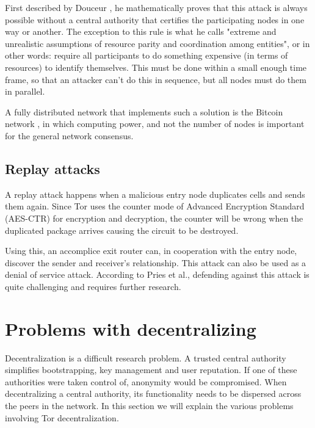 \documentclass{article}
\begin{document}
		First described by Douceur \cite{douceur2002sybil}, he mathematically proves that this attack is always possible without a central authority that certifies the participating nodes in one way or another. The exception to this rule is what he calls "extreme and unrealistic assumptions of resource parity and coordination among entities", or in other words: require all participants to do something expensive (in terms of resources) to identify themselves. This must be done within a small enough time frame, so that an attacker can't do this in sequence, but all nodes must do them in parallel.
		
		A fully distributed network that implements such a solution is the Bitcoin network \cite{nakamoto2008bitcoin}, in which computing power, and not the number of nodes is important for the general network consensus.
				
	\subsection{Replay attacks}
		A replay attack \cite{pries2008new} happens when a malicious entry node duplicates cells and sends them again. Since Tor uses the counter mode of Advanced Encryption Standard (AES-CTR) for encryption and decryption, the counter will be wrong when the duplicated package arrives causing the circuit to be destroyed.

		Using this, an accomplice exit router can, in cooperation with the entry node, discover the sender and receiver's relationship. This attack can also be used as a denial of service attack. According to Pries et al., defending against this attack is quite challenging and requires further research.

\section{Problems with decentralizing}
	\label{sec:problems}

	Decentralization is a difficult research problem. A trusted central authority simplifies bootstrapping, key management and user reputation. If one of these authorities were taken control of, anonymity would be compromised. When decentralizing a central authority, its functionality needs to be dispersed across the peers in the network. In this section we will explain the various problems involving Tor decentralization.
	
\end{document}
